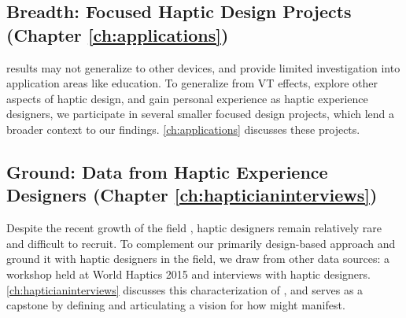 \subsection{Breadth: Focused Haptic Design Projects (Chapter \ref{ch:applications})}
 results may not generalize to other devices, and provide limited investigation into application areas like education.
To generalize from VT effects, explore other aspects of haptic design, and gain personal experience as haptic experience designers, we participate in several smaller focused design projects, which lend a broader context to our findings.
\autoref{ch:applications} discusses these projects.

\subsection{Ground: Data from Haptic Experience Designers (Chapter \ref{ch:hapticianinterviews})}
Despite the recent growth of the field , haptic designers remain relatively rare and difficult to recruit.
To complement our primarily design-based approach and ground it with haptic designers in the field, we draw from other data sources: a workshop held at World Haptics 2015 and interviews with haptic designers.
\autoref{ch:hapticianinterviews} discusses this characterization of \haxd, and serves as a capstone  by defining \haxd and articulating a vision for how \haxd might manifest.




\section{}


